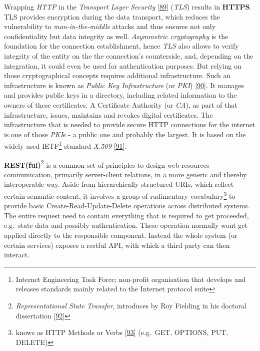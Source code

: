 \documentclass[12pt,english,a4paper,titlepage,cleardoublepage=empty,dottedtoc]{report}
\begin{document}
Wrapping \emph{HTTP} in the \emph{Transport Layer Security}
{[}\protect\hyperlink{ref-web_spec_tls}{89}{]} (\emph{TLS}) results in
\textbf{HTTPS}. TLS provides encryption during the data transport, which
reduces the vulnerability to \emph{man-in-the-middle} attacks and thus
ensures not only confidentiality but data integrity as well.
\emph{Asymmetric cryptography} is the foundation for the connection
establishment, hence \emph{TLS} also allows to verify integrity of the
entity on the the connection's counterside, and, depending on the
integration, it could even be used for authentication purposes. But
relying on those cryptographical concepts requires additional
infrastructure. Such an infrastructure is known as \emph{Public Key
Infrastructure} (or \emph{PKI})
{[}\protect\hyperlink{ref-book_2014_chapter-14-5-pki}{90}{]}. It manages
and provides public keys in a directory, including related information
to the owners of these certificates. A Certificate Authority (or
\emph{CA}), as part of that infrastructure, issues, maintains and
revokes digital certificates. The infrastructure that is needed to
provide secure HTTP connections for the internet is one of those
\emph{PKI}s - a public one and probably the largest. It is based on the
widely used IETF\footnote{Internet Engineering Task Force; non-profit
  organisation that develops and releases standards mainly related to
  the Internet protocol suite} standard \emph{X.509}
{[}\protect\hyperlink{ref-web_spec_x509}{91}{]}.

\textbf{REST(ful)}\footnote{\emph{Representational State Transfer},
  introduces by Roy Fielding in his doctoral dissertation
  {[}\protect\hyperlink{ref-web_spec_rest}{92}{]}} is a common set of
principles to design web resources communication, primarily
server-client relations, in a more generic and thereby interoperable
way. Aside from hierarchically structured URIs, which reflect certain
semantic content, it involves a group of rudimentary
vocabulary\footnote{knows as HTTP Methods or Verbs
  {[}\protect\hyperlink{ref-web_spec_http-methods}{93}{]} (e.g.~GET,
  OPTIONS, PUT, DELETE)} to provide basic Create-Read-Update-Delete
operations across distributed systems. The entire request need to
contain everything that is required to get proceeded, e.g.~state data
and possibly authentication. These operation normally wont get applied
directly to the responsible component. Instead the whole system (or
certain services) exposes a restful API, with which a third party can
then interact.
\end{document}
